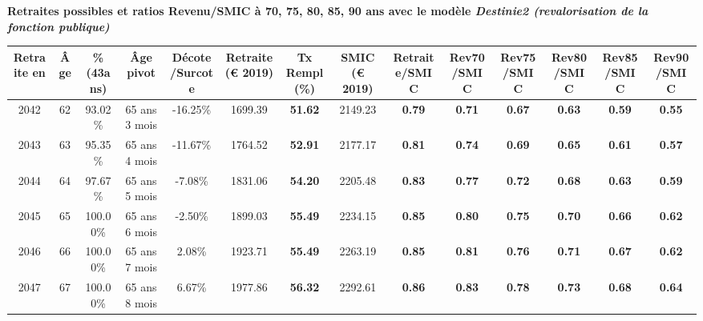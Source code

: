  \vspace{0.1cm} 
{\bf \noindent Retraites possibles et ratios Revenu/SMIC à 70, 75, 80, 85, 90 ans avec le modèle \emph{Destinie2 (revalorisation de la fonction publique)}}  
 
\begin{adjustbox}{max width=\textwidth} 
\begin{tabular}[htb]{|c|c||c|c|c||c|c||c||c|c|c|c|c|c|} 
\hline 
 Retraite en &  Âge &  \%(43ans) &  Âge pivot &  Décote/Surcote &  Retraite (\euro{} 2019) &  Tx Rempl(\%) &  SMIC (\euro{} 2019) &  Retraite/SMIC &  Rev70/SMIC &  Rev75/SMIC &  Rev80/SMIC &  Rev85/SMIC &  Rev90/SMIC \\ 
\hline \hline 
 2042 &  62 &  93.02\% &  65 ans 3 mois &  -16.25\% &  1699.39 &  {\bf 51.62} &  2149.23 &  {\bf {\color{red} 0.79}} &  {\bf {\color{red} 0.71}} &  {\bf {\color{red} 0.67}} &  {\bf {\color{red} 0.63}} &  {\bf {\color{red} 0.59}} &  {\bf {\color{red} 0.55}} \\ 
\hline 
 2043 &  63 &  95.35\% &  65 ans 4 mois &  -11.67\% &  1764.52 &  {\bf 52.91} &  2177.17 &  {\bf {\color{red} 0.81}} &  {\bf {\color{red} 0.74}} &  {\bf {\color{red} 0.69}} &  {\bf {\color{red} 0.65}} &  {\bf {\color{red} 0.61}} &  {\bf {\color{red} 0.57}} \\ 
\hline 
 2044 &  64 &  97.67\% &  65 ans 5 mois &  -7.08\% &  1831.06 &  {\bf 54.20} &  2205.48 &  {\bf {\color{red} 0.83}} &  {\bf {\color{red} 0.77}} &  {\bf {\color{red} 0.72}} &  {\bf {\color{red} 0.68}} &  {\bf {\color{red} 0.63}} &  {\bf {\color{red} 0.59}} \\ 
\hline 
 2045 &  65 &  100.00\% &  65 ans 6 mois &  -2.50\% &  1899.03 &  {\bf 55.49} &  2234.15 &  {\bf {\color{red} 0.85}} &  {\bf {\color{red} 0.80}} &  {\bf {\color{red} 0.75}} &  {\bf {\color{red} 0.70}} &  {\bf {\color{red} 0.66}} &  {\bf {\color{red} 0.62}} \\ 
\hline 
 2046 &  66 &  100.00\% &  65 ans 7 mois &  2.08\% &  1923.71 &  {\bf 55.49} &  2263.19 &  {\bf {\color{red} 0.85}} &  {\bf {\color{red} 0.81}} &  {\bf {\color{red} 0.76}} &  {\bf {\color{red} 0.71}} &  {\bf {\color{red} 0.67}} &  {\bf {\color{red} 0.62}} \\ 
\hline 
 2047 &  67 &  100.00\% &  65 ans 8 mois &  6.67\% &  1977.86 &  {\bf 56.32} &  2292.61 &  {\bf {\color{red} 0.86}} &  {\bf {\color{red} 0.83}} &  {\bf {\color{red} 0.78}} &  {\bf {\color{red} 0.73}} &  {\bf {\color{red} 0.68}} &  {\bf {\color{red} 0.64}} \\ 
\hline 
\hline 
\end{tabular} 
\end{adjustbox} 
 
